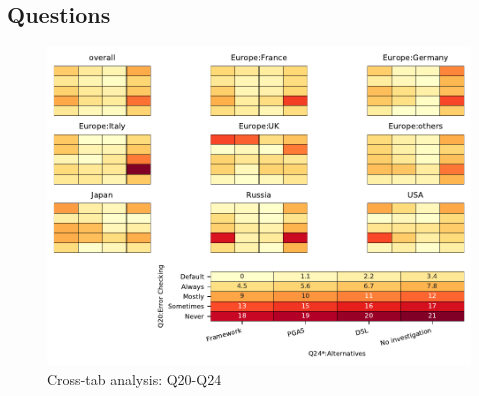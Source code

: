 
\subsection{Questions}


\begin{figure}
\begin{center}
\includegraphics[width=12cm]{../pdfs/Q20-Q24.pdf}
\caption{Cross-tab analysis: Q20-Q24}
\label{fig:Q20-Q24}
\end{center}
\end{figure}
